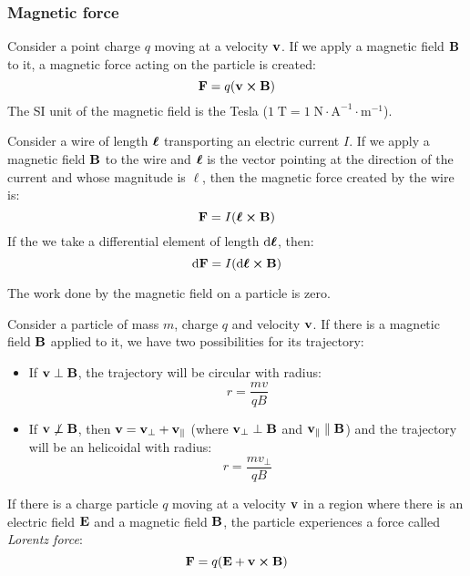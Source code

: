 \documentclass[../../../main.tex]{subfiles}
\begin{document}
\begin{multicols}{2}
    \subsubsection{Magnetic force}
    \begin{prop}
        Consider a point charge $q$ moving at a velocity $\boldsymbol{\mathrm{v}}$. If we apply a magnetic field $\boldsymbol{\mathrm{B}}$ to it, a magnetic force acting on the particle is created: $$\vf{F}=q(\vf{v}\crossprod\vf{B})$$ The SI unit of the magnetic field is the Tesla ($1\;\text{T}=1\;\text{N}\cdot\text{A}^{-1}\cdot\text{m}^{-1}$).
    \end{prop}
    \begin{prop}
        Consider a wire of length $\boldsymbol{\mathrm{\ell}}$ transporting an electric current $I$. If we apply a magnetic field $\boldsymbol{\mathrm{B}}$ to the wire and $\boldsymbol{\mathrm{\ell}}$ is the vector pointing at the direction of the current and whose magnitude is $\ell$, then the magnetic force created by the wire is: $$\vf{F}=I(\vf{\ell}\crossprod\vf{B})$$ If the we take a differential element of length $\dd\boldsymbol{\mathrm{\ell}}$, then: $$\dd \vf{F}=I(\dd\vf{\ell}\crossprod\vf{B})$$
    \end{prop}
    \begin{lemma}
        The work done by the magnetic field on a particle is zero.
    \end{lemma}
    \begin{prop}
        Consider a particle of mass $m$, charge $q$ and velocity $\boldsymbol{\mathrm{v}}$. If there is a magnetic field $\boldsymbol{\mathrm{B}}$ applied to it, we have two possibilities for its trajectory:
        \begin{itemize}
            \item If $\boldsymbol{\mathrm{v}}\perp\boldsymbol{\mathrm{B}}$, the trajectory will be circular with radius: $$r=\frac{mv}{qB}$$
            \item If $\boldsymbol{\mathrm{v}}\not\perp\boldsymbol{\mathrm{B}}$, then $\boldsymbol{\mathrm{v}}=\boldsymbol{\mathrm{v}}_\perp+\boldsymbol{\mathrm{v}}_\parallel$ (where $\boldsymbol{\mathrm{v}}_\perp\perp\boldsymbol{\mathrm{B}}$ and $\boldsymbol{\mathrm{v}}_\parallel\parallel\boldsymbol{\mathrm{B}}$) and the trajectory will be an helicoidal with radius: $$r=\frac{mv_\perp}{qB}$$
        \end{itemize}
    \end{prop}
    \begin{prop}
        If there is a charge particle $q$ moving at a velocity $\boldsymbol{\mathrm{v}}$ in a region where there is an electric field $\boldsymbol{\mathrm{E}}$ and a magnetic field $\boldsymbol{\mathrm{B}}$, the particle experiences a force called \textit{Lorentz force}: $$\vf{F}=q(\vf{E}+\vf{v}\crossprod\vf{B})$$
    \end{prop}

\end{multicols}
\end{document}
